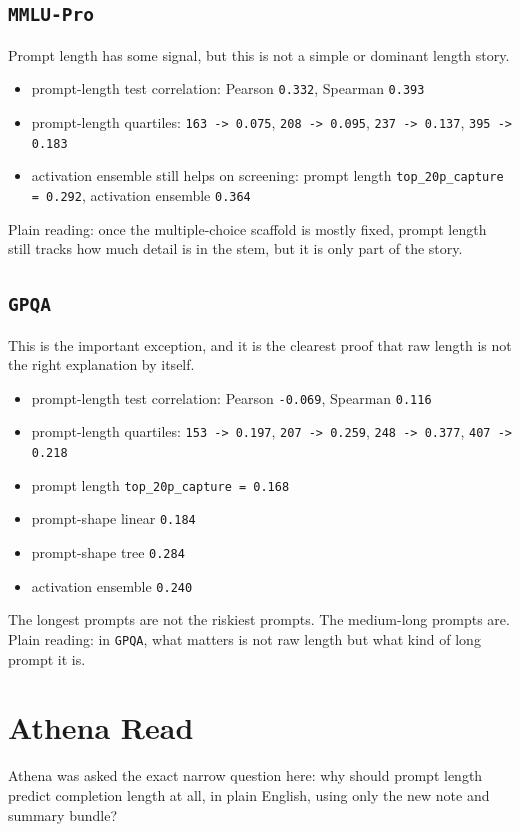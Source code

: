 \documentclass[11pt]{article}
\begin{document}
\subsection*{\texttt{MMLU-Pro}}
Prompt length has some signal, but this is not a simple or dominant length story.
\begin{itemize}[leftmargin=1.5em]
\item prompt-length test correlation: Pearson \texttt{0.332}, Spearman \texttt{0.393}
\item prompt-length quartiles: \texttt{163 -> 0.075}, \texttt{208 -> 0.095}, \texttt{237 -> 0.137}, \texttt{395 -> 0.183}
\item activation ensemble still helps on screening: prompt length \texttt{top\_20p\_capture = 0.292}, activation ensemble \texttt{0.364}
\end{itemize}
Plain reading: once the multiple-choice scaffold is mostly fixed, prompt length still tracks how much detail is in the stem, but it is only part of the story.

\subsection*{\texttt{GPQA}}
This is the important exception, and it is the clearest proof that raw length is not the right explanation by itself.
\begin{itemize}[leftmargin=1.5em]
\item prompt-length test correlation: Pearson \texttt{-0.069}, Spearman \texttt{0.116}
\item prompt-length quartiles: \texttt{153 -> 0.197}, \texttt{207 -> 0.259}, \texttt{248 -> 0.377}, \texttt{407 -> 0.218}
\item prompt length \texttt{top\_20p\_capture = 0.168}
\item prompt-shape linear \texttt{0.184}
\item prompt-shape tree \texttt{0.284}
\item activation ensemble \texttt{0.240}
\end{itemize}
The longest prompts are not the riskiest prompts. The medium-long prompts are. Plain reading: in \texttt{GPQA}, what matters is not raw length but what kind of long prompt it is.

\section*{Athena Read}
Athena was asked the exact narrow question here: why should prompt length predict completion length at all, in plain English, using only the new note and summary bundle?
\end{document}
